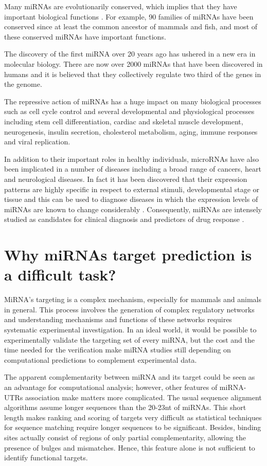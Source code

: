 Many miRNAs are evolutionarily conserved, which implies that they have important biological functions \cite{conserved_pairing}. For example, 90 families of miRNAs have been conserved since at least the common ancestor of mammals and fish, and most of these conserved miRNAs have important functions.

The discovery of the first miRNA over 20 years ago has ushered in a new era in molecular biology. There are now over 2000 miRNAs that have been discovered in humans and it is believed that they collectively regulate two third of the genes in the genome.

The repressive action of miRNAs has a huge impact on many biological processes such as cell cycle control and several developmental and physiological processes including stem cell differentiation, cardiac and skeletal muscle development, neurogenesis, insulin secretion, cholesterol metabolism, aging, immune responses and viral replication. \cite{mirna_annotation}

In addition to their important roles in healthy individuals, microRNAs have also been implicated in a number of diseases including a broad range of cancers, heart and neurological diseases.  In fact it has been discovered that their expression patterns  are highly specific in respect to external stimuli, developmental stage or tissue and this can be used to diagnose diseases in which the expression levels of miRNAs are known to change considerably \cite{computational_methods}. Consequently, miRNAs are intensely studied as candidates for clinical diagnosis and predictors of drug response \cite{mirna_diseases}.

\section{Why miRNAs target prediction is a difficult task?}
MiRNA's targeting is a complex mechanism, especially for mammals and animals in general. This process involves the generation of complex regulatory networks and understanding mechanisms and functions of these networks requires systematic experimental investigation. In an ideal world, it would be possible to experimentally validate the targeting set of every miRNA, but the cost and the time needed for the verification make miRNA studies still depending on computational predictions to complement experimental data.

The apparent complementarity between miRNA and its target could be seen as an advantage
for computational analysis; however, other features of miRNA-UTRs association make matters more complicated. The usual sequence alignment algorithms assume longer sequences than the  20-23nt of miRNAs. This short length makes ranking and scoring of targets very difficult as statistical techniques for sequence matching require longer sequences to be significant. Besides, binding sites actually consist of regions of only partial complementarity, allowing the presence of bulges and mismatches. Hence, this feature alone is not sufficient to identify functional targets.  

